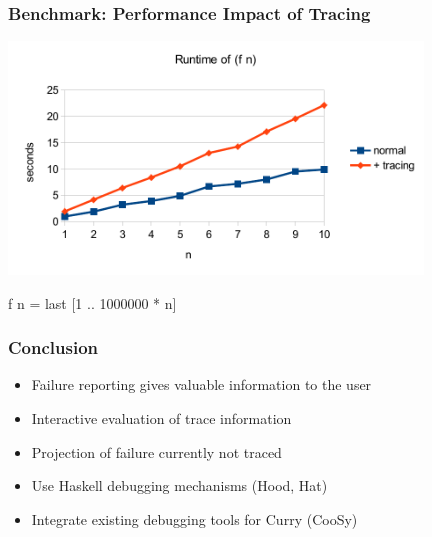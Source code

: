\documentclass[
,hyperref={pdfpagelabels=false}
,xcolor=dvipsnames
]{beamer}
\begin{document}
\begin{frame}%
\frametitle{Benchmark: Performance Impact of Tracing}

\begin{center}
\includegraphics[width=11cm]{benchmark}
\end{center}

\vspace{-.5cm}

\begin{curry}
f n = last [1 .. 1000000 * n]
\end{curry}

\bigskip

\end{frame}


\begin{frame}[fragile]%
\frametitle{Conclusion}

\begin{itemize}
\item Failure reporting gives valuable information to the user
\item Interactive evaluation of trace information
\item Projection of failure currently not traced
\end{itemize}

\begin{itemize}
\item Use Haskell debugging mechanisms (Hood, Hat)
\item Integrate existing debugging tools for Curry (CooSy)
\end{itemize}

\end{frame}
\end{document}
